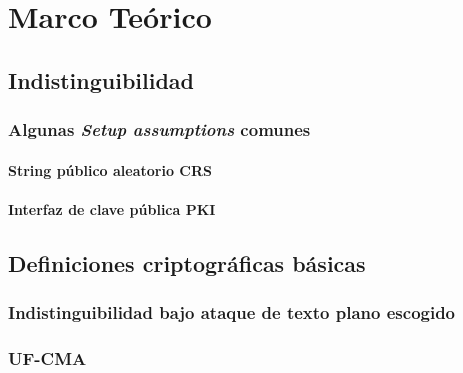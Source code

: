 \chapter{Marco Teórico}

\begin{definicion}
\end{definicion}

\section{Indistinguibilidad}

\subsection{Algunas \textit{Setup assumptions} comunes}
\subsubsection{String público aleatorio CRS}
\subsubsection{Interfaz de clave pública PKI}

\section{Definiciones criptográficas básicas}
\subsection{Indistinguibilidad bajo ataque de texto plano escogido}
\subsection{UF-CMA}
